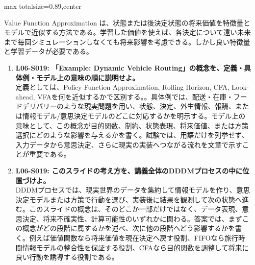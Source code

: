 \begin{minipage}[t]{0.58\textwidth}
\begin{adjustbox}{max totalsize={\textwidth}{0.89\textheight},center}
\begin{minipage}{\textwidth}
Value Function Approximation は、状態または後決定状態の将来価値を特徴量とモデルで近似する方法である。学習した価値を使えば、各決定について遠い未来まで毎回シミュレーションしなくても将来影響を考慮できる。しかし良い特徴量と学習データが必要である。\par{}\begin{enumerate}\item \textbf{L06-S019: 「Example: Dynamic Vehicle Routing」の概念を、定義・具体例・モデル上の意味の順に説明せよ。}\\定義としては、Policy Function Approximation, Rolling Horizon, CFA, Look-ahead, VFAを何を近似するかで区別する。。具体例では、配送・在庫・フードデリバリーのような現実問題を用い、状態、決定、外生情報、報酬、または情報モデル/意思決定モデルのどこに対応するかを明示する。モデル上の意味として、この概念が目的関数、制約、状態表現、将来価値、または方策選択にどのような影響を与えるかを書く。試験では、用語だけを列挙せず、入力データから意思決定、さらに現実の実装へつながる流れを文章で示すことが重要である。\item \textbf{L06-S019: このスライドの考え方を、講義全体のDDDMプロセスの中に位置づけよ。}\\DDDMプロセスでは、現実世界のデータを集約して情報モデルを作り、意思決定モデルまたは方策で行動を選び、実装後に結果を観測して次の状態へ進む。このスライドの概念は、そのどこか一部だけではなく、データ表現、意思決定、将来不確実性、計算可能性のいずれかに関わる。答案では、まずこの概念がどの段階に属するかを述べ、次に他の段階へどう影響するかを書く。例えば価値関数なら将来価値を現在決定へ戻す役割、FIFOなら旅行時間情報モデルの整合性を保証する役割、CFAなら目的関数を調整して将来に良い行動を誘導する役割である。\end{enumerate}
\end{minipage}
\end{adjustbox}
\end{minipage}


